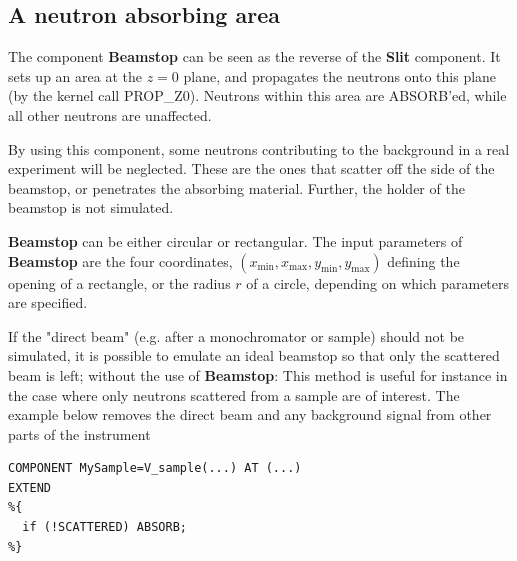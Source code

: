\subsection*{A neutron absorbing area}
\label{beamstop}


The component \textbf{Beamstop} can be seen as the reverse of
the \textbf{Slit} component.
It sets up an area at the $z=0$ plane, and propagates the neutrons
onto this plane (by the kernel call PROP\_Z0).
Neutrons within this area are ABSORB'ed,
while all other neutrons are unaffected.

By using this component, some neutrons contributing to the background
in a real experiment will be neglected.
These are the ones that scatter off the side
of the beamstop, or penetrates the absorbing material.
Further, the holder of the beamstop is not simulated.

\textbf{Beamstop} can be either circular or rectangular.
The input parameters of \textbf{Beamstop} are the four coordinates,
$(x_\textrm{min}, x_\textrm{max}, y_\textrm{min}, y_\textrm{max})$
defining the opening of a rectangle, or the radius $r$ of
a circle, depending on which parameters are specified.

If the "direct beam" (e.g. after a monochromator or sample) should not be
simulated, it is possible to emulate an ideal beamstop 
so that only the scattered beam is left;
without the use of \textbf{Beamstop}:
This method is useful for instance in the case where only neutrons 
scattered from a sample are of interest. 
The example below removes the direct beam and 
any background signal from other parts of the instrument
\begin{lstlisting}
COMPONENT MySample=V_sample(...) AT (...)
EXTEND
%{
  if (!SCATTERED) ABSORB;
%}
\end{lstlisting}
